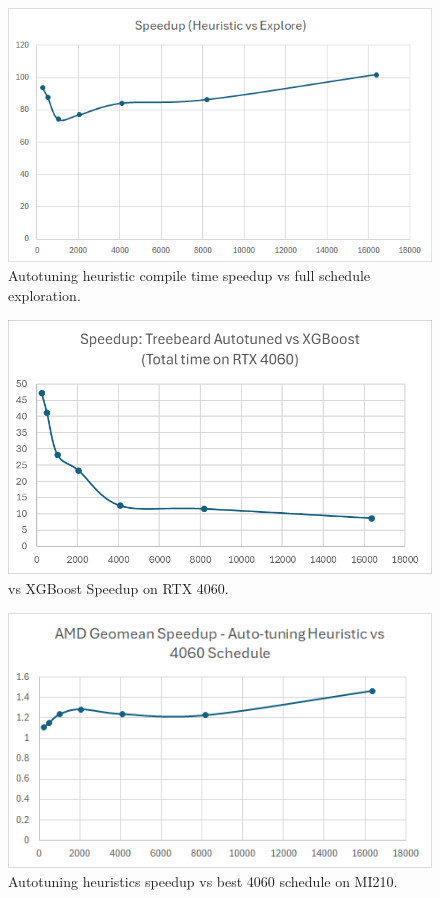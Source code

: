 \begin{figure}[htb]
  \centering
  \includegraphics[width=\linewidth]{figures/HeuristicVsFullExplore_Speedup.png}
  \caption{Autotuning heuristic compile time speedup vs full schedule exploration.}
  \label{Fig:HeuristicVsFullExplore_Speedup}
\end{figure}

\begin{figure}[htb]
  \centering
  \includegraphics[width=\linewidth]{figures/TBvsXGB_TotalTime.png}
  \caption{\Treebeard{} vs XGBoost Speedup on RTX 4060.}
  \label{Fig:TBvsXGBoost_Speedup}
\end{figure}

\begin{figure}[htb]
  \centering
  \includegraphics[width=\linewidth]{figures/AMD_MI210_ATHeuristicVs4060Sched_speedup.png}
  \caption{Autotuning heuristics speedup vs best 4060 schedule on MI210.}
  \label{Fig:AMD_MI210_ATHeuristicVs4060Sched_speedup}
\end{figure}


